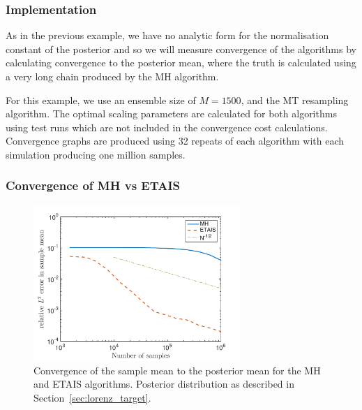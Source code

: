 \documentclass[final]{siamltex}
\begin{document}
\subsubsection{Implementation}\label{sec:lorenz_implementation}

As in the previous example, we have no analytic form for the normalisation constant of the posterior and so we will measure convergence of the algorithms by calculating convergence to the posterior mean, where the truth is calculated using a very long chain produced by the MH algorithm.

For this example, we use an ensemble size of {\red $M=1500$}, and the MT resampling algorithm. The optimal scaling parameters are calculated for both algorithms using test runs which are not included in the convergence cost calculations. Convergence graphs are produced using 32 repeats of each algorithm with each simulation producing one million samples.

\subsubsection{Convergence of MH vs ETAIS}\label{sec:lorenz_conv}




\begin{figure}[htb]
\centering
\includegraphics[width=0.7\textwidth]{"figures/Lorenz_convergence"}
\caption{Convergence of the sample mean to the posterior mean for the MH and ETAIS algorithms. Posterior distribution as described in Section~\ref{sec:lorenz_target}.}
\label{fig:Lorenz_convergence}
\end{figure}
\end{document}
